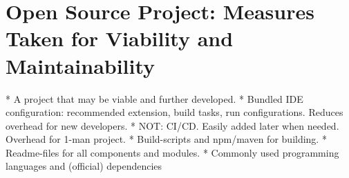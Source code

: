 \section{Open Source Project: Measures Taken for Viability and Maintainability}

* A project that may be viable and further developed.
  * Bundled IDE configuration: recommended extension, build tasks, run configurations. Reduces overhead for new developers.
  * NOT: CI/CD. Easily added later when needed. Overhead for 1-man project.
  * Build-scripts and npm/maven for building.
  * Readme-files for all components and modules.
  * Commonly used programming languages and (official) dependencies
  
